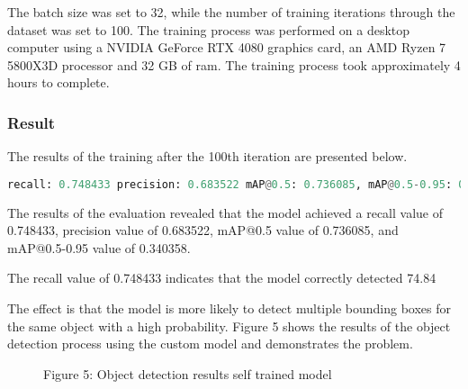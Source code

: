 The batch size was set to 32, while the number of training iterations through the dataset was set to 100. The training process was performed on a desktop computer using a NVIDIA GeForce RTX 4080 graphics card, an AMD Ryzen 7 5800X3D processor and 32 GB of ram. The training process took approximately 4 hours to complete.


\subsubsection{Result }

The results of the training after the 100th iteration are presented below.

\begin{lstlisting}[language=python]
    recall: 0.748433 precision: 0.683522 mAP@0.5: 0.736085, mAP@0.5-0.95: 0.340358
\end{lstlisting}

The results of the evaluation revealed that the model achieved a recall value of 0.748433, precision value of 0.683522, mAP@0.5 value of 0.736085, and mAP@0.5-0.95 value of 0.340358. 

The recall value of 0.748433 indicates that the model correctly detected 74.84%

The effect is that the model is more likely to detect multiple bounding boxes for the same object with a high probability. Figure 5 shows the results of the object detection process using the custom model and demonstrates the problem. 

\begin{figure}[!htbp]
    \centering
    \caption{Figure 5: Object detection results self trained model }
\end{figure}

